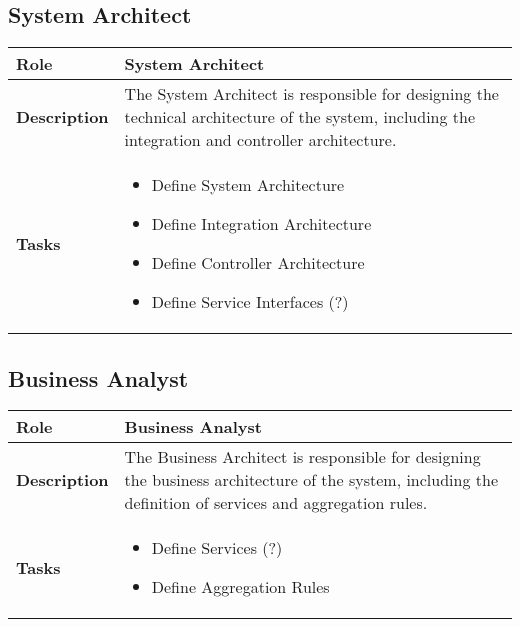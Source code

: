 \subsection{System Architect} 
\begin{minipage}{\textwidth}
\label{table:ch6_Role_System_Architect}
\begin{tabular}
	{|m{2cm}|m{10cm}|} \hline \bfseries Role & System Architect\\
	\hline \bfseries Description & The System Architect is responsible for designing the technical architecture of the system, including the integration and controller architecture.\\
	\hline \bfseries Tasks & 
	\begin{itemize}
		\item Define System Architecture 
		\item Define Integration Architecture
		\item Define Controller Architecture
		\item Define Service Interfaces (?)
	\end{itemize}
	\\
	\hline 
\end{tabular}
\end{minipage}

\subsection{Business Analyst}
\begin{minipage}{\textwidth}
 \label{table:ch6_Role_Business_Analysist}
\begin{tabular}
	{|m{2cm}|m{10cm}|} \hline \bfseries Role & Business Analyst\\
	\hline \bfseries Description & The Business Architect is responsible for designing the business architecture of the system, including the definition of services and aggregation rules.\\
	\hline \bfseries Tasks & 
	\begin{itemize}
		\item Define Services (?)
		\item Define Aggregation Rules
	\end{itemize}
	\\
	\hline 
\end{tabular}
\end{minipage}

